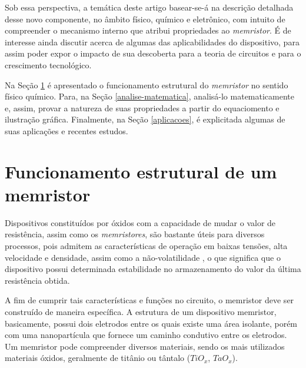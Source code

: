 \documentclass{ceel}
\begin{document}
\begin{multicols}{2}
Sob essa perspectiva, a temática deste artigo basear-se-á na descrição detalhada desse novo componente, no âmbito físico, químico e eletrônico, com intuito de compreender o mecanismo interno que atribui propriedades ao \emph{memristor}. É de interesse ainda discutir acerca de algumas das aplicabilidades do dispositivo, para assim poder expor o impacto de sua descoberta para a teoria de circuitos e para o crescimento tecnológico.

Na Seção \ref{funcionamento-estrutural} é apresentado o funcionamento estrutural do \emph{memristor} no sentido físico químico. Para, na Seção \ref{analise-matematica}, analisá-lo matematicamente e, assim, provar a natureza de suas propriedades a partir do equaciomento e ilustração gráfica. Finalmente, na Seção \ref{aplicacoes}, é explicitada algumas de suas aplicações e recentes estudos.


\section{Funcionamento estrutural de um memristor} \label{funcionamento-estrutural}
Dispositivos constituídos por óxidos com a capacidade de mudar o valor de resistência, %
assim como os \emph{memristores}, são bastante úteis para diversos processos, pois %
admitem as características de operação em baixas tensões, alta velocidade e densidade, %
assim como a não-volatilidade \cite{conceito}, o que significa que o dispositivo possui determinada estabilidade no armazenamento do valor da última resistência obtida. 

A fim de cumprir tais características e funções no circuito, o memristor deve ser construído de maneira específica. A estrutura de um dispositivo memristor, basicamente, possui dois eletrodos entre os quais existe uma área isolante, porém com uma nanopartícula que fornece um caminho condutivo entre os eletrodos. %
Um memristor pode compreender diversos materiais, sendo os mais utilizados materiais óxidos, geralmente de titânio ou tântalo \cite{us} ($TiO_x$, $TaO_x$).


\end{multicols}
\end{document}
